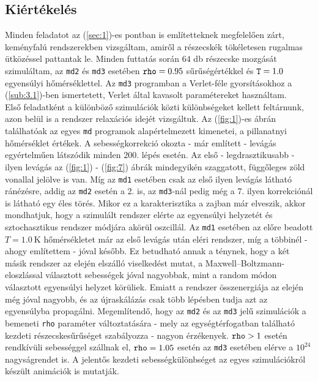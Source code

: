\begin{multicols}{2}
\section{Kiértékelés} \label{sec:5}
Minden feladatot az (\ref{sec:1})-es pontban is említetteknek megfelelően zárt, keményfalú rendszerekben vizsgáltam, amiről a részecskék tökéletesen rugalmas ütközéssel pattantak le. Minden futtatás során $64$ db részecske mozgását szimuláltam, az \texttt{md2} és \texttt{md3} esetében $\text{\texttt{rho}} = 0.95$ sűrűségértékkel és $\text{\texttt{T}} = 1.0$ egyensúlyi hőmérséklettel. Az \texttt{md3} programban a Verlet-féle gyorsításokhoz a (\ref{sub:3.1})-ben ismertetett, Verlet által kavasolt paramétereket használtam. \\
Első feladatként a különböző szimulációk közti különbségeket kellett feltárnunk, azon belül is a rendszer relaxációs idejét vizsgáltuk. Az (\ref{fig:1})-es ábrán találhatóak az egyes \texttt{md} programok alapértelmezett kimenetei, a pillanatnyi hőmérséklet értékek. A sebességkorrekció okozta - már említett - levágás egyértelműen látszódik minden $200$. lépés esetén. Az első - legdrasztikusabb - ilyen levágás az (\ref{fig:1}) - (\ref{fig:7}) ábrák mindegyikén szaggatott, függőleges zöld vonallal jelölve is van. Míg az \texttt{md1} esetében csak az első ilyen levágás látható ránézésre, addig az \texttt{md2} esetén a 2. is, az \texttt{md3}-nál pedig még a 7. ilyen korrekciónál is látható egy éles törés. Mikor ez a karakterisztika a zajban már elveszik, akkor mondhatjuk, hogy a szimulált rendszer elérte az egyensúlyi helyzetét és sztochasztikus rendszer módjára akörül oszcillál. Az \texttt{md1} esetében az előre beadott $T = 1.0\ \text{K}$ hőmérsékletet már az első levágás után eléri rendszer, míg a többinél - ahogy említettem - jóval később. Ez betudható annak a ténynek, hogy a két másik rendszer az elején elszálló viselkedést mutat, a Maxwell--Boltzmann-eloszlással választott sebességek jóval nagyobbak, mint a random módon választott egyensúlyi helyzet körüliek. Emiatt a rendszer összenergiája az elején még jóval nagyobb, és az újraskálázás csak több lépésben tudja azt az egyensúlyba propagálni. Megemlítendő, hogy az \texttt{md2} és az \texttt{md3} jelű szimulációk a bemeneti \texttt{rho} paraméter változtatására - mely az egységtérfogatban található kezdeti részecskesűrűséget szabályozza - nagyon érzékenyek. $\text{\texttt{rho}} > 1$ esetén rendkívüli sebességgel szállnak el, $\text{\texttt{rho}} = 1.05$ esetén az \texttt{md3} esetében elérve a $10^{24}$ nagyságrendet is. A jelentős kezdeti sebességkülönbséget az egyes szimulációkról készült animációk is mutatják\cite{yt}. \\

\end{multicols}
